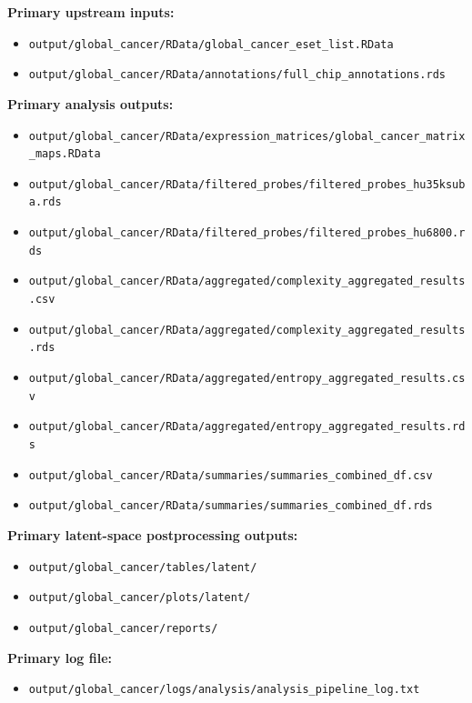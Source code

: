 \documentclass[
  letterpaper,
  DIV=11,
  numbers=noendperiod,
  openany,
  oneside]{scrreprt}
\providecommand{\tightlist}{%
  \setlength{\itemsep}{0pt}\setlength{\parskip}{0pt}}
\begin{document}
\textbf{Primary upstream inputs:}

\begin{itemize}
\tightlist
\item
  \texttt{output/global\_cancer/RData/global\_cancer\_eset\_list.RData}
\item
  \texttt{output/global\_cancer/RData/annotations/full\_chip\_annotations.rds}
\end{itemize}

\textbf{Primary analysis outputs:}

\begin{itemize}
\tightlist
\item
  \texttt{output/global\_cancer/RData/expression\_matrices/global\_cancer\_matrix\_maps.RData}
\item
  \texttt{output/global\_cancer/RData/filtered\_probes/filtered\_probes\_hu35ksuba.rds}
\item
  \texttt{output/global\_cancer/RData/filtered\_probes/filtered\_probes\_hu6800.rds}
\item
  \texttt{output/global\_cancer/RData/aggregated/complexity\_aggregated\_results.csv}
\item
  \texttt{output/global\_cancer/RData/aggregated/complexity\_aggregated\_results.rds}
\item
  \texttt{output/global\_cancer/RData/aggregated/entropy\_aggregated\_results.csv}
\item
  \texttt{output/global\_cancer/RData/aggregated/entropy\_aggregated\_results.rds}
\item
  \texttt{output/global\_cancer/RData/summaries/summaries\_combined\_df.csv}
\item
  \texttt{output/global\_cancer/RData/summaries/summaries\_combined\_df.rds}
\end{itemize}

\textbf{Primary latent-space postprocessing outputs:}

\begin{itemize}
\tightlist
\item
  \texttt{output/global\_cancer/tables/latent/}
\item
  \texttt{output/global\_cancer/plots/latent/}
\item
  \texttt{output/global\_cancer/reports/}
\end{itemize}

\textbf{Primary log file:}

\begin{itemize}
\tightlist
\item
  \texttt{output/global\_cancer/logs/analysis/analysis\_pipeline\_log.txt}
\end{itemize}
\end{document}
